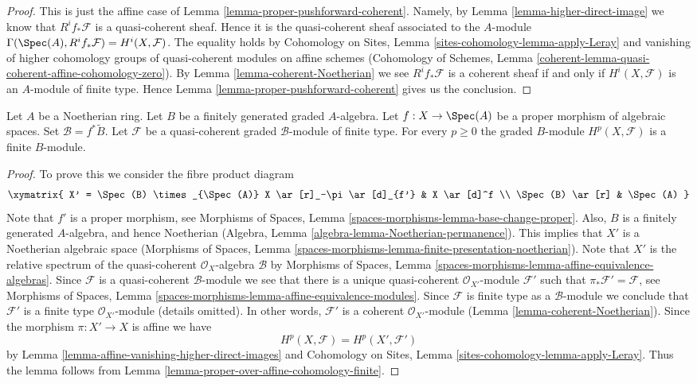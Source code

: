 \begin{proof}
This is just the affine case of Lemma \ref{lemma-proper-pushforward-coherent}.
Namely, by Lemma \ref{lemma-higher-direct-image} we know that
$R^if_*\mathcal{F}$ is a quasi-coherent sheaf. Hence it is the quasi-coherent
sheaf associated to the $A$-module
$\Gamma(\Spec(A), R^if_*\mathcal{F}) = H^i(X, \mathcal{F})$.
The equality holds by
Cohomology on Sites, Lemma \ref{sites-cohomology-lemma-apply-Leray}
and vanishing of higher cohomology groups of quasi-coherent modules
on affine schemes (Cohomology of Schemes, Lemma
\ref{coherent-lemma-quasi-coherent-affine-cohomology-zero}).
By Lemma \ref{lemma-coherent-Noetherian} we see $R^if_*\mathcal{F}$ is
a coherent sheaf if and only if $H^i(X, \mathcal{F})$
is an $A$-module of finite type. Hence
Lemma \ref{lemma-proper-pushforward-coherent} gives us the conclusion.
\end{proof}

\begin{lemma}
\label{lemma-graded-finiteness}
Let $A$ be a Noetherian ring.
Let $B$ be a finitely generated graded $A$-algebra.
Let $f : X \to \Spec(A)$ be a proper morphism of algebraic spaces.
Set $\mathcal{B} = f^*\widetilde B$.
Let $\mathcal{F}$ be a quasi-coherent
graded $\mathcal{B}$-module of finite type.
For every $p \geq 0$ the graded $B$-module $H^p(X, \mathcal{F})$
is a finite $B$-module.
\end{lemma}

\begin{proof}
To prove this we consider the fibre product diagram
$$
\xymatrix{
X' = \Spec(B) \times_{\Spec(A)} X
\ar[r]_-\pi \ar[d]_{f'} &
X \ar[d]^f \\
\Spec(B) \ar[r] &
\Spec(A)
}
$$
Note that $f'$ is a proper morphism, see
Morphisms of Spaces, Lemma \ref{spaces-morphisms-lemma-base-change-proper}.
Also, $B$ is a finitely generated $A$-algebra, and hence
Noetherian (Algebra, Lemma \ref{algebra-lemma-Noetherian-permanence}).
This implies that $X'$ is a Noetherian algebraic space
(Morphisms of Spaces, Lemma
\ref{spaces-morphisms-lemma-finite-presentation-noetherian}).
Note that $X'$ is the relative spectrum of the quasi-coherent
$\mathcal{O}_X$-algebra $\mathcal{B}$ by
Morphisms of Spaces, Lemma
\ref{spaces-morphisms-lemma-affine-equivalence-algebras}.
Since $\mathcal{F}$ is a quasi-coherent $\mathcal{B}$-module
we see that there is a unique quasi-coherent
$\mathcal{O}_{X'}$-module $\mathcal{F}'$ such that
$\pi_*\mathcal{F}' = \mathcal{F}$, see
Morphisms of Spaces, Lemma
\ref{spaces-morphisms-lemma-affine-equivalence-modules}.
Since $\mathcal{F}$ is finite type as a $\mathcal{B}$-module we
conclude that $\mathcal{F}'$ is a finite type
$\mathcal{O}_{X'}$-module (details omitted). In other words,
$\mathcal{F}'$ is a coherent $\mathcal{O}_{X'}$-module
(Lemma \ref{lemma-coherent-Noetherian}).
Since the morphism $\pi : X' \to X$ is affine we have
$$
H^p(X, \mathcal{F}) = H^p(X', \mathcal{F}')
$$
by
Lemma \ref{lemma-affine-vanishing-higher-direct-images}
and
Cohomology on Sites, Lemma \ref{sites-cohomology-lemma-apply-Leray}.
Thus the lemma follows from
Lemma \ref{lemma-proper-over-affine-cohomology-finite}.
\end{proof}




